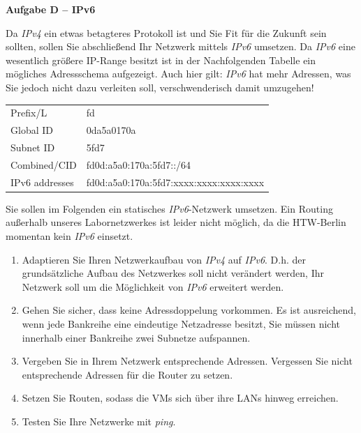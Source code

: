 \documentclass[paper=a4,fontsize=11pt]{scrartcl}%
\numberwithin{equation}{section}
\begin{document}
\begin{center}\Large{\textbf{Aufgabe D -- IPv6}}\end{center}\vskip0.25in
Da \emph{IPv4} ein etwas betagteres Protokoll ist und Sie Fit für die Zukunft sein sollten, sollen Sie abschließend Ihr Netzwerk mittels \emph{IPv6} umsetzen. Da \emph{IPv6} eine wesentlich größere IP-Range besitzt ist in der Nachfolgenden Tabelle ein mögliches Adressschema aufgezeigt. Auch hier gilt: \emph{IPv6} hat mehr Adressen, was Sie jedoch nicht dazu verleiten soll, verschwenderisch damit umzugehen!
\begin{table}[H]
\centering
\begin{tabular}{ll}
 Prefix/L & fd  \\
 Global ID & 0da5a0170a \\
 Subnet ID &  5fd7\\
 Combined/CID & fd0d:a5a0:170a:5fd7::/64 \\
 IPv6 addresses & fd0d:a5a0:170a:5fd7:xxxx:xxxx:xxxx:xxxx 
\end{tabular}
\end{table}
Sie sollen im Folgenden ein statisches \emph{IPv6}-Netzwerk umsetzen. Ein Routing außerhalb unseres Labornetzwerkes ist leider nicht möglich, da die HTW-Berlin momentan kein \emph{IPv6} einsetzt.
\begin{enumerate}
	\item Adaptieren Sie Ihren Netzwerkaufbau von \emph{IPv4} auf \emph{IPv6}. D.h. der grundsätzliche Aufbau des Netzwerkes soll nicht verändert werden, Ihr Netzwerk soll um die Möglichkeit von \emph{IPv6} erweitert werden.
	\item Gehen Sie sicher, dass keine Adressdoppelung vorkommen. Es ist ausreichend, wenn jede Bankreihe eine eindeutige Netzadresse besitzt, Sie müssen nicht innerhalb einer Bankreihe zwei Subnetze aufspannen.
	\item Vergeben Sie in Ihrem Netzwerk entsprechende Adressen. Vergessen Sie nicht entsprechende Adressen für die Router zu setzen.
	\item Setzen Sie Routen, sodass die VMs sich über ihre LANs hinweg erreichen.
	\item Testen Sie Ihre Netzwerke mit \emph{ping}.
\end{enumerate}
\end{document}
